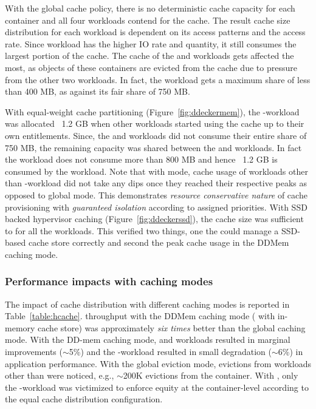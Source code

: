 With the global cache policy, there is no deterministic cache capacity 
for each container and all four workloads contend for the cache.
The result cache size distribution for each workload is dependent
on its access patterns and the access rate. Since \video{} workload
has the higher IO rate and quantity, it still consumes the largest
portion of the cache. The cache of the \web{} and \mail{} workloads
gets affected the most, as objects of these containers are evicted
from the cache due to pressure from the other two workloads.
In fact, the \mail{} workload gets a maximum share of less than 400 MB,
as against its fair share of 750 MB.

%
With \dd{} equal-weight cache partitioning (Figure~\ref{fig:ddeckermem}), 
the \video-workload was allocated ~1.2 GB when other workloads started 
using the cache up to their own entitlements. 
Since, the \proxy{} and \mail{} workloads did not consume their 
entire share of 750 MB,
the remaining capacity was shared between the \video{} and \web{} workloads.
In fact the \web{} workload does not consume more than 800 MB and hence
~1.2 GB is consumed by the \video{} workload.
%
Note that with \dd{} mode, cache usage of workloads other than \video-workload 
did not take any dips once they reached their respective peaks as opposed to
global mode.
%
This demonstrates {\em resource conservative nature} of \dd{} 
cache provisioning with {\em guaranteed isolation} according
to assigned priorities.
%
With SSD backed hypervisor caching (Figure~\ref{fig:ddeckerssd}), the cache 
size was sufficient to for all the workloads. This verified two things,
one the \dd{} could manage a SSD-based cache store correctly and
second the peak cache usage in the DDMem caching mode.
%


\subsubsection{Performance impacts with caching modes}
The impact of cache distribution with different caching modes
is reported in Table~\ref{table:hcache}.
%
\web{} throughput with the DDMem caching mode (\dd{} with in-memory cache store)
was approximately {\em six times} better than the global caching mode.
%
With the \dd{}  DD-mem caching mode, \mail{} and \proxy{} workloads resulted
in marginal improvements ($\sim$5\%) and the \video-workload resulted 
in small degradation ($\sim$6\%) in application performance.
%
With the global eviction mode, evictions from workloads other than
\video{} were noticed, e.g., $\sim$200K evictions from the \web{} container. 
%
With \dd, only the \video-workload was victimized to enforce
equity at the container-level according to the equal cache distribution
configuration.

